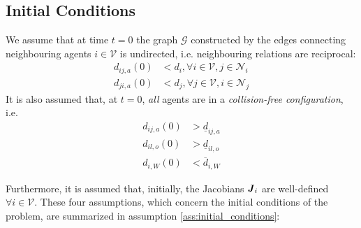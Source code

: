 \subsection{Initial Conditions}

We assume that at time $t=0$ the graph $\mathcal{G}$ constructed by the edges
connecting neighbouring agents $i \in \mathcal{V}$ is undirected, i.e.
neighbouring relations are reciprocal:
\begin{subequations}
\begin{align}
  d_{ij,a}(0) &< d_i, \forall i \in \mathcal{V}, j \in \mathcal{N}_i \label{eq:initially_connected_0} \\
  d_{ji,a}(0) &< d_j, \forall j \in \mathcal{V}, i \in \mathcal{N}_j \label{eq:initially_connected_1}
\end{align}
\end{subequations}
It is also assumed that, at $t=0$, \textit{all} agents are in a
\textit{collision-free configuration}, i.e.
  \begin{align}
    d_{ij,a}(0) &> \underline{d}_{ij,a} \\
    d_{il,o}(0) &> \underline{d}_{il,o} \\
    d_{i,W}(0)  &< \overline{d}_{i,W}
\label{eq:initially_coll_free}
\end{align}

Furthermore, it is assumed that, initially, the Jacobians $\bm{\mathit{J}}_i$ are
well-defined $\forall i \in \mathcal{V}$. These four assumptions, which concern
the initial conditions of the problem, are summarized in assumption
\ref{ass:initial_conditions}:

